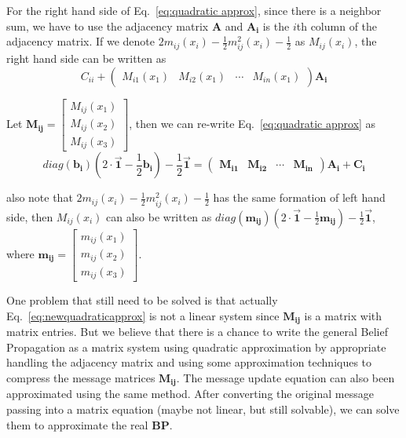 For the right hand side of Eq.~\ref{eq:quadratic approx}, since there is a neighbor sum, we have to use the adjacency matrix $\mathbf{A}$ and $\mathbf{A_i}$ is the $i$th column of the adjacency matrix. If we denote $2m_{ij}(x_i)-\frac{1}{2}m_{ij}^2(x_i)-\frac{1}{2}$ as $M_{ij}(x_i)$, the right hand side can be written as
\begin{equation}
C_{ii} + \left( \begin{array}{cccc}
M_{i1}(x_1)&M_{i2}(x_1)&\cdots& M_{in}(x_1)\end{array} \right)\mathbf{A_i}
\end{equation}

Let $\mathbf{M_{ij}} = \left[ \begin{array}{c}
M_{ij}(x_1) \\
M_{ij}(x_2) \\
M_{ij}(x_3) \end{array} \right]$, then we can re-write Eq.~\ref{eq:quadratic approx} as
\begin{equation}
\label{eq:newquadraticapprox}
diag(\mathbf{b_i})
(2\cdot\mathbf{\vec{1}}
-\frac{1}{2}\mathbf{b_i})-
\frac{1}{2}\mathbf{\vec{1}}
= \left( \begin{array}{cccc}
\mathbf{M_{i1}}&\mathbf{M_{i2}}&\cdots& \mathbf{M_{in}}\end{array} \right)\mathbf{A_i}+\mathbf{C_i}
\end{equation}

also note that $2m_{ij}(x_i)-\frac{1}{2}m_{ij}^2(x_i)-\frac{1}{2}$ has the same formation of left hand side, then $M_{ij}(x_i)$ can also be written as
$diag(\mathbf{m_{ij}})(2\cdot\mathbf{\vec{1}}-\frac{1}{2}\mathbf{m_{ij}})-\frac{1}{2}\mathbf{\vec{1}}$, where $\mathbf{m_{ij}}=\left[ \begin{array}{c}
m_{ij}(x_1) \\
m_{ij}(x_2) \\
m_{ij}(x_3) \end{array} \right]$.

One problem that still need to be solved is that actually Eq.~\ref{eq:newquadraticapprox} is not a linear system since $\mathbf{M_{ij}}$ is a matrix with matrix entries. But we believe that there is a chance to write the general Belief Propagation as a matrix system using quadratic approximation by appropriate handling the adjacency matrix and using some approximation techniques to compress the message matrices $\mathbf{M_{ij}}$. The message update equation can also been approximated using the same method. After converting the original message passing into a matrix equation (maybe not linear, but still solvable), we can solve them to approximate the real \textbf{BP}.

